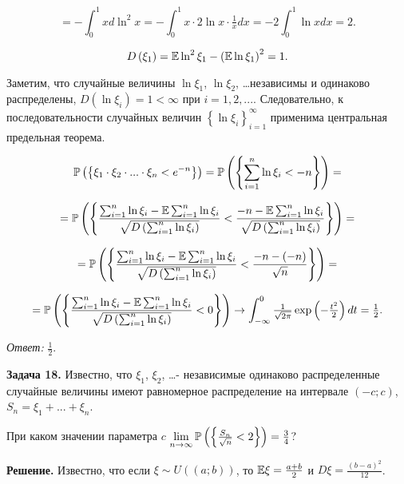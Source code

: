 \[=-\int _{0}^{1}xd\ln ^{2} x =-\int _{0}^{1}x\cdot 2\ln x\cdot {\tfrac{1}{x}} dx =-2\int _{0}^{1}\ln xdx =2.\] 

\[D\left(\xi _{1} \right)={\rm {\mathbb E}}\ln ^{2} \xi _{1} -\left({\rm {\mathbb E}}\ln \xi _{1} \right)^{2} =1.\] 

Заметим, что случайные величины $\ln \xi _{1} $, $\ln \xi _{2} $, \dots  независимы и одинаково распределены, $D\left(\ln \xi _{i} \right)=1<\infty $ при $i=1,2,...$. Следовательно, к последовательности случайных величин $\left\{\ln \xi _{i} \right\}_{i=1}^{\infty } $ применима центральная предельная теорема. 

\[{\rm {\mathbb P}}\left(\left\{\xi _{1} \cdot \xi _{2} \cdot ...\cdot \xi _{n} <e^{-n} \right\}\right)={\rm {\mathbb P}}\left(\left\{\sum _{i=1}^{n}\ln \xi _{i}  <-n\right\}\right)=\] 

\[={\rm {\mathbb P}}\left(\left\{\frac{\sum _{i=1}^{n}\ln \xi _{i}  -{\rm {\mathbb E}}\sum _{i=1}^{n}\ln \xi _{i}  }{\sqrt{D\left(\sum _{i=1}^{n}\ln \xi _{i}  \right)} } <\frac{-n-{\rm {\mathbb E}}\sum _{i=1}^{n}\ln \xi _{i}  }{\sqrt{D\left(\sum _{i=1}^{n}\ln \xi _{i}  \right)} } \right\}\right)=\] 

\[={\rm {\mathbb P}}\left(\left\{\frac{\sum _{i=1}^{n}\ln \xi _{i}  -{\rm {\mathbb E}}\sum _{i=1}^{n}\ln \xi _{i}  }{\sqrt{D\left(\sum _{i=1}^{n}\ln \xi _{i}  \right)} } <\frac{-n-\left(-n\right)}{\sqrt{n} } \right\}\right)=\] 

\[={\rm {\mathbb P}}\left(\left\{\frac{\sum _{i=1}^{n}\ln \xi _{i}  -{\rm {\mathbb E}}\sum _{i=1}^{n}\ln \xi _{i}  }{\sqrt{D\left(\sum _{i=1}^{n}\ln \xi _{i}  \right)} } <0\right\}\right)\to \int _{-\infty }^{0}{\tfrac{1}{\sqrt{2\pi } }} \exp \left(-{\tfrac{t^{2} }{2}} \right)dt ={\tfrac{1}{2}} .\] 

\textit{Ответ:} ${\tfrac{1}{2}} $.



\textbf{Задача 18. }Известно, что $\xi _{1} $, $\xi _{2} $, \dots  - независимые одинаково распределенные случайные величины имеют равномерное распределение на интервале $\left(-c;c\right)$, $S_{n} =\xi _{1} +...+\xi _{n} $. 

При каком значении параметра $c$ $\mathop{\lim }\limits_{n\to \infty } {\rm {\mathbb P}}\left(\left\{\frac{S_{n} }{\sqrt{n} } <2\right\}\right)=\frac{3}{4} $?

\textbf{Решение. }Известно, что если $\xi \sim U\left(\left(a;b\right)\right)$, то ${\rm {\mathbb E}}\xi =\frac{a+b}{2} $ и $D\xi =\frac{\left(b-a\right)^{2} }{12} $. 

